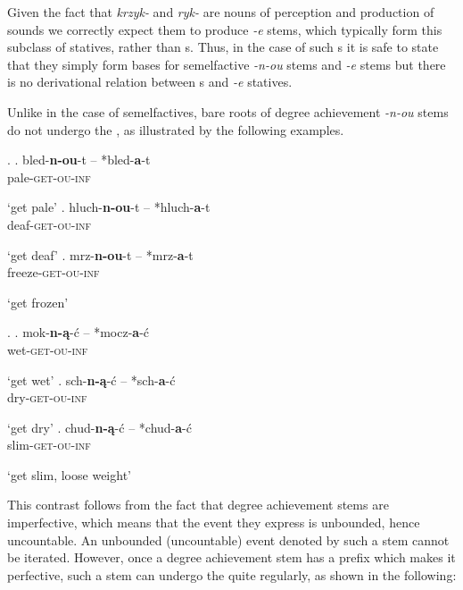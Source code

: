 Given the fact that \textit{krzyk-} and \textit{ryk-} are nouns of perception and production of sounds we correctly expect them to produce \textit{-e} stems, which typically form this subclass of statives, rather than s. Thus, in the case of such s it is safe to state that they simply form bases for semelfactive \textit{-n-ou} stems and \textit{-e} stems but there is no derivational relation between s and \textit{-e} statives.
\par
Unlike in the case of semelfactives, bare roots of degree achievement \textit{-n-ou} stems do not undergo the  , as illustrated by the following examples.\largerpage

\ex.  
\ag.	
{bled-\textbf{n-ou}-t} -- *bled-\textbf{a}-t\\
{pale-\textsc{get-ou}-\textsc{inf}}\\
\strut `get pale'
\bg. 
{hluch-\textbf{n-ou}-t} -- *hluch-\textbf{a}-t\\
{deaf-\textsc{get-ou}-\textsc{inf}}\\
\strut `get deaf'
\cg. 
{mrz-\textbf{n-ou}-t} -- *mrz-\textbf{a}-t\\
{freeze-\textsc{get-ou}-\textsc{inf}}\\
\strut `get frozen'

\ex. \label{Pol:da:not}
\ag.	
{mok-\textbf{n-\k{a}}-\'c} -- *mocz-\textbf{a}-\'c\\
{wet-\textsc{get-ou}-\textsc{inf}}\\
\strut`get wet'
\bg.
{sch-\textbf{n-\k{a}}-\'c} -- *sch-\textbf{a}-\'c \\
{dry-\textsc{get-ou}-\textsc{inf}}\\
\strut `get dry'
\cg.
{chud-\textbf{n-\k{a}}-\'c} -- *chud-\textbf{a}-\'c \\
{slim-\textsc{get-ou}-\textsc{inf}}\\
\strut `get slim, loose weight'

\noindent
This contrast follows from the fact that  degree achievement stems are imperfective, which means that the event they express is unbounded, hence uncountable. An unbounded (uncountable) event denoted by such a stem cannot be iterated. However, once a degree achievement stem has a prefix which makes it perfective, such a stem can undergo the   quite regularly, as shown in the following: 


